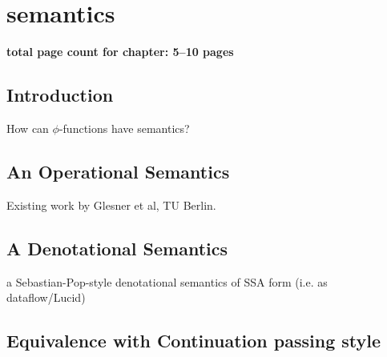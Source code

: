 \applynumberofpages\chapter{semantics }


\textbf{total page count for chapter: 5--10 pages}


\section{Introduction}

How can $\phi$-functions have semantics?


\section{An Operational Semantics}

Existing work by Glesner et al, TU Berlin.


\section{A Denotational Semantics}

a Sebastian-Pop-style denotational semantics of SSA form (i.e. as
dataflow/Lucid)




\section{Equivalence with Continuation passing style}


